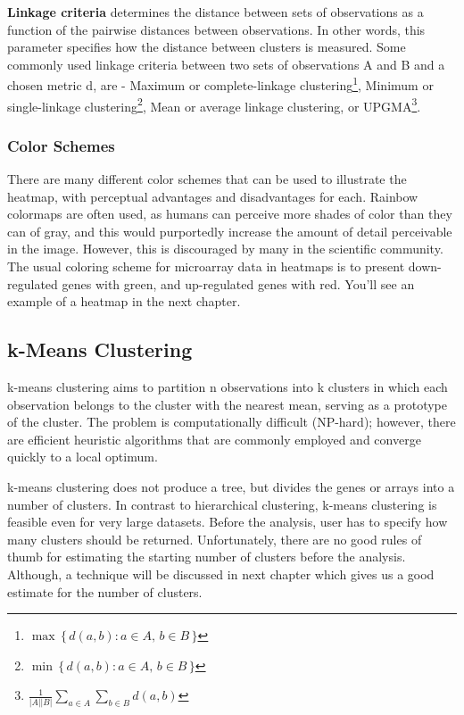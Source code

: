 \documentclass[oneside, a4paper, 11pt]{book}
\begin{document}
\medskip
\textbf{Linkage criteria} determines the distance between sets of observations as a function of the pairwise distances between observations. In other words, this parameter specifies how the distance between clusters is measured. Some commonly used  linkage criteria between two sets of observations A and B and a chosen metric d, are - Maximum or complete-linkage clustering\footnote{$\max \, \{\, d(a,b) : a \in A,\, b \in B \,\}$}, Minimum or single-linkage clustering\footnote{$\min \, \{\, d(a,b) : a \in A,\, b \in B \,\}$}, Mean or average linkage clustering, or UPGMA\footnote{$\frac{1}{|A| |B|} \sum_{a \in A }\sum_{ b \in B} d(a,b)$}.

\subsubsection{Color Schemes}
There are many different color schemes that can be used to illustrate the heatmap, with perceptual advantages and disadvantages for each. Rainbow colormaps are often used, as humans can perceive more shades of color than they can of gray, and this would purportedly increase the amount of detail perceivable in the image. However, this is discouraged by many in the scientific community. The usual coloring scheme for microarray data in heatmaps is to present down-regulated genes with green, and up-regulated genes with red. You'll see an example of a heatmap in the next chapter.

\subsection{k-Means Clustering}
k-means clustering aims to partition n observations into k clusters in which each observation belongs to the cluster with the nearest mean, serving as a prototype of the cluster. The problem is computationally difficult (NP-hard); however, there are efficient heuristic algorithms that are commonly employed and converge quickly to a local optimum. 

k-means clustering does not produce a tree, but divides the genes or arrays into a number of clusters. In contrast to hierarchical clustering, k-means clustering is feasible even for very large datasets. Before the analysis, user has to specify how many clusters should be returned. Unfortunately, there are no good rules of thumb for estimating the starting number of clusters before the analysis. Although, a technique will be discussed in next chapter which gives us a good estimate for the number of clusters.
\end{document}
